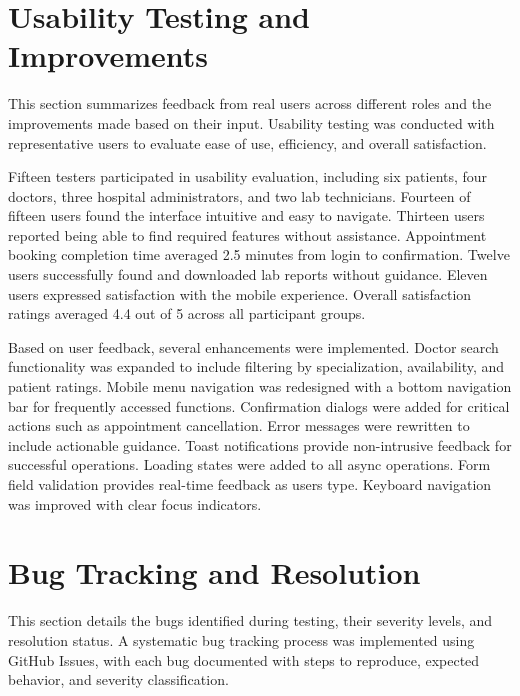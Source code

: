 \section{Usability Testing and Improvements}

\justifying
\noindent This section summarizes feedback from real users across different roles and the improvements made based on their input. Usability testing was conducted with representative users to evaluate ease of use, efficiency, and overall satisfaction.

\justifying
\noindent Fifteen testers participated in usability evaluation, including six patients, four doctors, three hospital administrators, and two lab technicians. Fourteen of fifteen users found the interface intuitive and easy to navigate. Thirteen users reported being able to find required features without assistance. Appointment booking completion time averaged 2.5 minutes from login to confirmation. Twelve users successfully found and downloaded lab reports without guidance. Eleven users expressed satisfaction with the mobile experience. Overall satisfaction ratings averaged 4.4 out of 5 across all participant groups.

\justifying
\noindent Based on user feedback, several enhancements were implemented. Doctor search functionality was expanded to include filtering by specialization, availability, and patient ratings. Mobile menu navigation was redesigned with a bottom navigation bar for frequently accessed functions. Confirmation dialogs were added for critical actions such as appointment cancellation. Error messages were rewritten to include actionable guidance. Toast notifications provide non-intrusive feedback for successful operations. Loading states were added to all async operations. Form field validation provides real-time feedback as users type. Keyboard navigation was improved with clear focus indicators.

\section{Bug Tracking and Resolution}

\justifying
\noindent This section details the bugs identified during testing, their severity levels, and resolution status. A systematic bug tracking process was implemented using GitHub Issues, with each bug documented with steps to reproduce, expected behavior, and severity classification.

